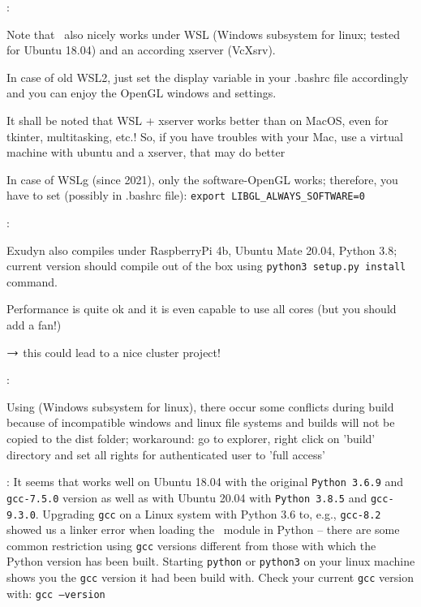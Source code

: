 \noindent {}:
\bi
  \item Note that \codeName\ also nicely works under WSL (Windows subsystem for linux; tested for Ubuntu 18.04) and an according xserver (VcXsrv).
  \item In case of old WSL2, just set the display variable in your .bashrc file accordingly and you can enjoy the OpenGL windows and settings.
  \item It shall be noted that WSL + xserver works better than on MacOS, even for tkinter, multitasking, etc.! So, if you have troubles with your Mac, use a virtual machine with ubuntu and a xserver, that may do better
  \item In case of WSLg (since 2021), only the software-OpenGL works; therefore, you have to set (possibly in .bashrc file): \texttt{export LIBGL\_ALWAYS\_SOFTWARE=0}
\ei

\noindent {}:
\bi
  \item Exudyn also compiles under RaspberryPi 4b, Ubuntu Mate 20.04, Python 3.8; current version should compile out of the box using \texttt{python3 setup.py install} command.
  \item Performance is quite ok and it is even capable to use all cores (but you should add a fan!)
  \item $\rightarrow$ this could lead to a nice cluster project!
\ei

\noindent {}:
\bi
  \item Using  (Windows subsystem for linux), there occur some conflicts during build because of incompatible windows and linux file systems and builds will not be copied to the dist folder; workaround: go to explorer, right click on 'build' directory and set all rights for authenticated user to 'full access'
  \item {}: It seems that \codeName works well on Ubuntu 18.04 with the original \texttt{Python 3.6.9} and \texttt{gcc-7.5.0} version as well as with Ubuntu 20.04 with \texttt{Python 3.8.5} and \texttt{gcc-9.3.0}. Upgrading \texttt{gcc} on a Linux system with Python 3.6 to, e.g., \texttt{gcc-8.2} showed us a linker error when loading the \codeName\ module in Python -- there are some common restriction using \texttt{gcc} versions different from those with which the Python version has been built. Starting \texttt{python} or \texttt{python3} on your linux machine shows you the \texttt{gcc} version it had been build with. Check your current \texttt{gcc} version with: \texttt{gcc --version}
\ei

